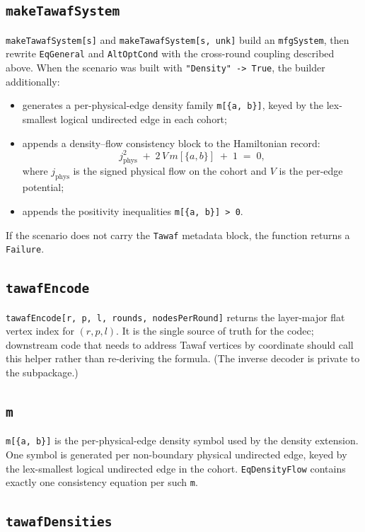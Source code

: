 \documentclass[11pt]{article}
\begin{document}
\subsection*{\texttt{makeTawafSystem}}

\texttt{makeTawafSystem[s]} and \texttt{makeTawafSystem[s, unk]} build an \texttt{mfgSystem}, then rewrite \texttt{EqGeneral} and \texttt{AltOptCond} with the cross-round coupling described above. When the scenario was built with \texttt{"Density" -> True}, the builder additionally:
\begin{itemize}
\item generates a per-physical-edge density family \texttt{m[\{a, b\}]}, keyed by the lex-smallest logical undirected edge in each cohort;
\item appends a density--flow consistency block to the Hamiltonian record:
\[
j_{\text{phys}}^2 \;+\; 2\, V\, m[\{a, b\}] \;+\; 1 \;=\; 0,
\]
where $j_{\text{phys}}$ is the signed physical flow on the cohort and $V$ is the per-edge potential;
\item appends the positivity inequalities \texttt{m[\{a, b\}] > 0}.
\end{itemize}
If the scenario does not carry the \texttt{Tawaf} metadata block, the function returns a \texttt{Failure}.

\subsection*{\texttt{tawafEncode}}

\texttt{tawafEncode[r, p, l, rounds, nodesPerRound]} returns the layer-major flat vertex index for $(r, p, l)$. It is the single source of truth for the codec; downstream code that needs to address Tawaf vertices by coordinate should call this helper rather than re-deriving the formula. (The inverse decoder is private to the subpackage.)

\subsection*{\texttt{m}}

\texttt{m[\{a, b\}]} is the per-physical-edge density symbol used by the density extension. One symbol is generated per non-boundary physical undirected edge, keyed by the lex-smallest logical undirected edge in the cohort. \texttt{EqDensityFlow} contains exactly one consistency equation per such \texttt{m}.

\subsection*{\texttt{tawafDensities}}
\end{document}
